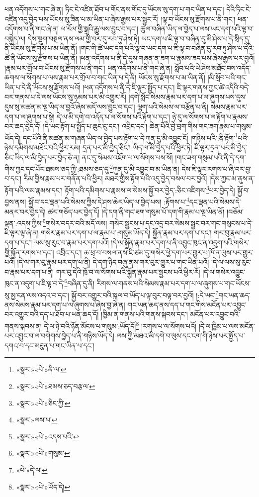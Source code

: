 ཕན་འདོགས་པ་གང་ཞེ་ན། ཏིང་ངེ་འཛིན་ཐོབ་པ་གོང་ནས་གོང་དུ་ཡོངས་སུ་དག་པ་གང་ཡིན་པ་དང་། དེའི་ཏིང་ངེ་འཛིན་འདུ་བྱེད་པས་ཡོངས་སུ་ཟིན་པ་མ་ཡིན་པ་ཞེས་རྒྱས་པར་སྦྱར་རོ། །ལྟ་བ་ཡོངས་སུ་རྫོགས་པ་ནི་གང་། ཕན་འདོགས་པ་ནི་གང་ཞེ་ན། ཕ་རོལ་གྱི་སྒྲའི་རྒྱུ་ལས་བྱུང་བ་དང་། ཚུལ་བཞིན་ཡིད་ལ་བྱེད་པ་ལས་ཡང་དག་པའི་ལྟ་བ་བསྐྱེད་ལ། དེས་སྡུག་བསྔལ་ནས་ལམ་གྱི་བར་དུ་རབ་ཏུ་ཤེས་ཏེ། ཡང་དག་པ་ཇི་ལྟ་བ་བཞིན་དུ་མི་ཤེས་པ་དེ་སྲིད་དུ་ནི་ཡོངས་སུ་རྫོགས་པ་མ་ཡིན་ནོ། །གང་གི་ཚེ་ཡང་དག་པའི་ལྟ་བ་ཡང་དག་པ་ཇི་ལྟ་བ་བཞིན་དུ་རབ་ཏུ་ཤེས་པ་དེའི་ཚེ་ནི་ཡོངས་སུ་རྫོགས་པ་ཡིན་ནོ། །ཕན་འདོགས་པ་ནི་དེ་དུས་གཞན་ན་ཟག་པ་རྣམས་ཟད་པས་ཞེས་རྒྱས་པར་བྱའོ། །རྣམ་པར་གྲོལ་བ་ཡོངས་སུ་རྫོགས་པ་ནི་གང་། ཕན་འདོགས་པ་ནི་གང་ཞེ་ན། སློབ་པའི་ཡེ་ཤེས་མཐོང་བས་འདོད་ཆགས་ལ་སོགས་པ་ལས་རྣམ་པར་གྲོལ་བ་གང་ཡིན་པ་དེ་ནི། ཡོངས་སུ་རྫོགས་པ་མ་ཡིན་ནོ། །མི་སློབ་པའི་གང་ཡིན་པ་དེ་ནི་ཡོངས་སུ་རྫོགས་པའོ། །ཕན་འདོགས་པ་ནི་དེ་ཇི་ལྟར་སྤྱོད་པ་དང་། ཇི་ལྟར་གནས་ཀྱང་ཚེ་འདིའི་བདེ་བར་གནས་པ་དེ་ལས་ཡོངས་སུ་ཉམས་པར་མི་འགྱུར་རོ། །དགེ་སློང་སེམས་རྣམ་པར་དག་པ་ལ་ཞུགས་པས་དུས་དུས་སུ་མཚན་མ་ལྔ་ཡིད་ལ་བྱའོ་ཞེས་མདོ་ལས་བྱུང་བ་དང་། ལྷག་པའི་སེམས་ལ་བརྩོན་པ་ནི། སེམས་རྣམ་པར་དག་པ་ལ་ཞུགས་པ་སྟེ། དེ་ལ་མི་དགེ་བ་འདོད་པ་ལ་སོགས་པའི་རྟོག་པ་དང་། ཉེ་དུ་ལ་སོགས་པ་ལ་རྟོག་པ་རྣམས་བར་ཆད་བྱེད་དོ། །དེ་ཡང་རྟོག་པ་སྤྱོད་པ་ཆུང་ངུ་དང་། འབྲིང་དང་། ཆེན་པོའི་བྱེ་བྲག་གིས་གང་ཟག་རྣམ་པ་གསུམ་ཡོད་དེ། དང་པོའི་ནི་མཚན་མ་གཞན་ཡིད་ལ་བྱེད་པས་རྟོག་པ་དེ་ཀུན་དུ་མི་འབྱུང་ངོ། །གཉིས་པའི་:ནི་རྟོག་\footnote{«སྣར་»«པེ་»ནི་ལ་}པའི་ཉེས་དམིགས་མཐོང་བའི་ཕྱིར་རམ། དྲན་པར་མི་བྱེད་ཅིང་། ཡིད་ལ་མི་བྱེད་པའི་ཕྱིར་ཏེ། ཇི་ལྟར་དྲན་པར་མི་བྱེད་ཅིང་ཡིད་ལ་མི་བྱེད་པར་བྱེད་ཅེ་ན། ནང་དུ་སེམས་འཇོག་པ་ལ་སོགས་པས་སོ། །གང་ཟག་གསུམ་པའི་ནི་དེ་དག་གིས་ཀྱང་དང་པོར་ཐམས་ཅད་ཀྱི་:ཐམས་ཅད་དུ་\footnote{«སྣར་»«པེ་»ཐམས་ཅད་བརྩལ་}ཀུན་དུ་མི་འབྱུང་བ་མ་ཡིན་ན། དེས་ཇི་ལྟར་རགས་པ་ཞི་བར་བྱ་བ་དང་། རིམ་གྱིས་རྣམ་པར་གནོན་པའི་ཕྱིར། མཐར་གྱིས་རྟོག་པའི་འདུ་བྱེད་བསལ་བར་བྱའོ། །དེས་ཀྱང་མ་ནུས་ན་རྟོག་པའི་ལམ་རྣམས་དང་། རྟོག་པའི་དམིགས་པ་རྣམས་ལ་སེམས་སྐྱོ་བར་བྱེད་:ཅིང་འཇིགས་\footnote{«སྣར་»«པེ་»ཅིང་ཀྱི་}པར་བྱེད་དེ། སྐྱོ་བ་བྱས་ནས། སྐྱོ་བ་དང་ལྡན་པའི་སེམས་ཀྱིས་དེ་ཤས་ཆེར་ཡིད་ལ་བྱེད་པས། :རྟོགས་པ་\footnote{«སྣར་»ལས་པ་}དང་ལྡན་པའི་སེམས་དེ་མནར་བར་བྱེད་དེ། ཚར་གཅོད་པར་བྱེད་དོ། །དེ་དག་ནི་གང་ཟག་གསུམ་པོ་དག་གི་རྣམ་པ་ལྔ་ཡིན་ནོ། །བཅོམ་ལྡན་:འདས་ཀྱིས་\footnote{«སྣར་»«པེ་»འདས་པའི་}གསེར་བདར་བའི་མདོ་ལས། གསེར་སྦྱངས་པ་དང་འདྲ་བར་སེམས་སྦྱང་བར་གང་གསུངས་པ་དེ་ཇི་ལྟར་ལྟ་ཞེ་ན། གསེར་རྣམ་པར་དག་པ་ལ་རྣམ་པ་:གསུམ་ཡོད་དེ། སྐྱོན་རྣམ་པར་དག་པ་དང་། གར་བུ་རྣམ་པར་དག་པ་དང་། ལས་སུ་རུང་བ་རྣམ་པར་དག་པའོ། །དེ་ལ་སྐྱོན་རྣམ་པར་དག་པ་ནི་འབྱུང་ཁུང་ན་འདུག་པའི་གསེར་གྱི་སྐྱོན་རགས་པ་དང་། འབྲིང་དང་། ཆ་ཕྲ་བ་བསལ་ནས་ཇི་ཙམ་དུ་གསེར་ཕྱེ་དག་པར་གྱུར་པ་ཁོ་ན་ལུས་པར་གྱུར་པའོ། །དེ་ལ་གར་བུ་རྣམ་པར་དག་པ་ནི། དེ་དག་ཉིད་བཞུ་ནས་གར་བུར་གྱུར་པ་གང་ཡིན་པའོ། །དེ་ལ་ལས་སུ་རུང་བ་རྣམ་པར་དག་པ་ནི། གར་བུ་དེའི་ཁྲོ་བ་ལ་སོགས་པའི་སྐྱོན་རྣམ་པར་སྦྱངས་པའི་ཕྱིར་རོ། །དེ་ལ་གསེར་འབྱུང་ཁུང་ན་འདུག་པ་ཇི་ལྟ་བ་དེ་\footnote{«སྣར་»«པེ་»གསུམ་}བཞིན་དུ་ནི། རིགས་ལ་གནས་པའི་སེམས་རྣམ་པར་དག་པ་ལ་ཞུགས་པ་གང་ཡོངས་སུ་མྱ་ངན་ལས་འདའ་བ་དང་། སྐྱོ་བར་འགྱུར་བའི་སྐལ་བ་ཡོད་པ་ལྟ་བུར་བལྟ་བར་བྱའོ། །:དེ་ཡང་\footnote{«པེ་»དེ་ལ་}གང་ཡན་ཆད་ནས་སེམས་རྣམ་པར་དག་པ་ལ་ཞུགས་པ་ཞེས་བྱ་ཞེ་ན། གང་ཡན་ཆད་ནས་དད་པ་གང་གིས་མངོན་པར་འབྱུང་བར་འགྱུར་བའི་དད་པ་ཐོབ་པ་ཡན་ཆད་དོ། །ཁྱིམ་ན་གནས་པའི་གནས་སྐབས་དང་། མངོན་པར་འབྱུང་བའི་གནས་སྐབས་ན། དེ་ལ་ཉེ་བའི་ཉོན་མོངས་པ་གསུམ་:ཡོད་དོ།\footnote{«སྣར་»«པེ་»ཡོད་དེ།} །རགས་པ་ལ་སོགས་པའོ། །དེ་ལ་ཁྱིམ་པ་ལས་མངོན་པར་འབྱུང་བ་ལ་བགེགས་བྱེད་པ་ནི་གཉིས་ཡོད་དེ། ལས་ཀྱི་མཐའ་མི་དགེ་བ་ལུས་དང་ངག་གི་ཉེས་པར་སྤྱོད་པ་དགའ་བ་དང་མཐུན་པ་གང་ཡིན་པ་དང་། 